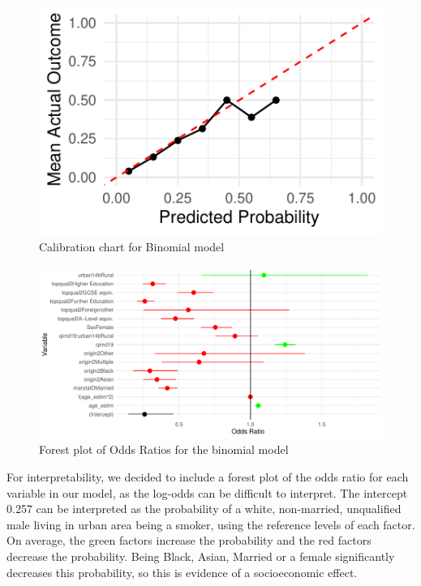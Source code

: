 \documentclass[
  11pt,
  twocolumn]{article}
\begin{document}
\begin{figure}[H]

{\centering \includegraphics{Coursework_files/figure-latex/output-calibration-chart-1} 

}

\caption{Calibration chart for Binomial model}\label{fig:output-calibration-chart}
\end{figure}

\begin{figure}[H]
\includegraphics{Coursework_files/figure-latex/output-forest-plot-1} \caption{Forest plot of Odds Ratios for the binomial model}\label{fig:output-forest-plot}
\end{figure}

For interpretability, we decided to include a forest plot of the odds
ratio for each variable in our model, as the log-odds can be difficult
to interpret. The intercept 0.257 can be interpreted as the probability
of a white, non-married, unqualified male living in urban area being a
smoker, using the reference levels of each factor. On average, the green
factors increase the probability and the red factors decrease the
probability. Being Black, Asian, Married or a female significantly
decreases this probability, so this is evidence of a socioeconomic
effect.
\end{document}
